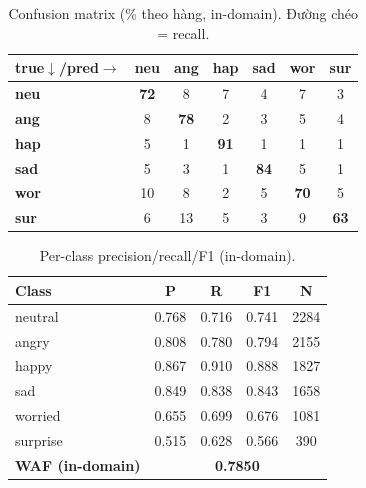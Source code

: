 \documentclass[10pt]{article}
\begin{document}
\begin{table}[H]\centering\footnotesize\setlength{\tabcolsep}{4pt}
\begin{tabular}{lcccccc}
\toprule
\textbf{true$\downarrow$/pred$\rightarrow$} & \textbf{neu} & \textbf{ang} & \textbf{hap} & \textbf{sad} & \textbf{wor} & \textbf{sur} \\
\midrule
\textbf{neu} & \cellcolor{cmblue!50}\textbf{72} & \cellcolor{cmblue!5}8 & \cellcolor{cmblue!5}7 & \cellcolor{cmblue!3}4 & \cellcolor{cmblue!5}7 & \cellcolor{cmblue!2}3 \\
\textbf{ang} & \cellcolor{cmblue!6}8 & \cellcolor{cmblue!55}\textbf{78} & \cellcolor{cmblue!1}2 & \cellcolor{cmblue!2}3 & \cellcolor{cmblue!4}5 & \cellcolor{cmblue!3}4 \\
\textbf{hap} & \cellcolor{cmblue!4}5 & \cellcolor{cmblue!1}1 & \cellcolor{cmblue!64}\textbf{91} & \cellcolor{cmblue!1}1 & \cellcolor{cmblue!0}1 & \cellcolor{cmblue!1}1 \\
\textbf{sad} & \cellcolor{cmblue!4}5 & \cellcolor{cmblue!2}3 & \cellcolor{cmblue!1}1 & \cellcolor{cmblue!59}\textbf{84} & \cellcolor{cmblue!3}5 & \cellcolor{cmblue!1}1 \\
\textbf{wor} & \cellcolor{cmblue!7}10 & \cellcolor{cmblue!6}8 & \cellcolor{cmblue!2}2 & \cellcolor{cmblue!4}5 & \cellcolor{cmblue!49}\textbf{70} & \cellcolor{cmblue!3}5 \\
\textbf{sur} & \cellcolor{cmblue!4}6 & \cellcolor{cmblue!9}13 & \cellcolor{cmblue!4}5 & \cellcolor{cmblue!2}3 & \cellcolor{cmblue!7}9 & \cellcolor{cmblue!44}\textbf{63} \\
\bottomrule
\end{tabular}
\caption{Confusion matrix (\% theo hàng, in-domain). Đường chéo = recall.}
\end{table}

\begin{table}[H]\centering\footnotesize
\begin{tabular}{lcccc}
\toprule
\textbf{Class} & \textbf{P} & \textbf{R} & \textbf{F1} & \textbf{N} \\
\midrule
neutral & 0.768 & 0.716 & 0.741 & 2284 \\
angry & 0.808 & 0.780 & 0.794 & 2155 \\
happy & 0.867 & 0.910 & 0.888 & 1827 \\
sad & 0.849 & 0.838 & 0.843 & 1658 \\
worried & 0.655 & 0.699 & 0.676 & 1081 \\
surprise & 0.515 & 0.628 & 0.566 & 390 \\
\midrule
\textbf{WAF (in-domain)} & \multicolumn{4}{c}{\textbf{0.7850}} \\
\bottomrule
\end{tabular}
\caption{Per-class precision/recall/F1 (in-domain).}
\end{table}
\end{document}
